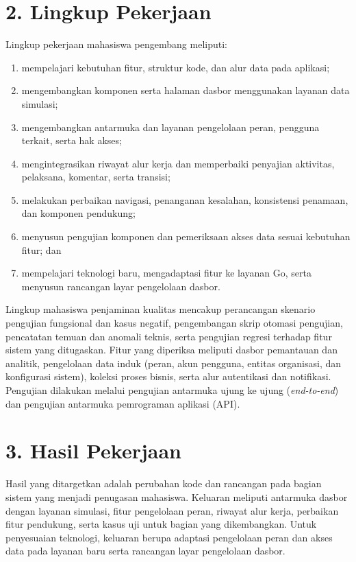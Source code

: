 \section*{2. Lingkup Pekerjaan}
Lingkup pekerjaan mahasiswa pengembang meliputi:
\begin{enumerate}[label=\alph*)]
\item mempelajari kebutuhan fitur, struktur kode, dan alur data pada aplikasi;
\item mengembangkan komponen serta halaman dasbor menggunakan layanan data simulasi;
\item mengembangkan antarmuka dan layanan pengelolaan peran, pengguna terkait, serta hak akses;
\item mengintegrasikan riwayat alur kerja dan memperbaiki penyajian aktivitas, pelaksana, komentar, serta transisi;
\item melakukan perbaikan navigasi, penanganan kesalahan, konsistensi penamaan, dan komponen pendukung;
\item menyusun pengujian komponen dan pemeriksaan akses data sesuai kebutuhan fitur; dan
\item mempelajari teknologi baru, mengadaptasi fitur ke layanan Go, serta menyusun rancangan layar pengelolaan dasbor.
\end{enumerate}
Lingkup mahasiswa penjaminan kualitas mencakup perancangan skenario pengujian fungsional dan kasus negatif, pengembangan skrip otomasi pengujian, pencatatan temuan dan anomali teknis, serta pengujian regresi terhadap fitur sistem yang ditugaskan. Fitur yang diperiksa meliputi dasbor pemantauan dan analitik, pengelolaan data induk (peran, akun pengguna, entitas organisasi, dan konfigurasi sistem), koleksi proses bisnis, serta alur autentikasi dan notifikasi. Pengujian dilakukan melalui pengujian antarmuka ujung ke ujung (\textit{end-to-end}) dan pengujian antarmuka pemrograman aplikasi (API).

\section*{3. Hasil Pekerjaan}
Hasil yang ditargetkan adalah perubahan kode dan rancangan pada bagian sistem yang menjadi penugasan mahasiswa. Keluaran meliputi antarmuka dasbor dengan layanan simulasi, fitur pengelolaan peran, riwayat alur kerja, perbaikan fitur pendukung, serta kasus uji untuk bagian yang dikembangkan. Untuk penyesuaian teknologi, keluaran berupa adaptasi pengelolaan peran dan akses data pada layanan baru serta rancangan layar pengelolaan dasbor.

